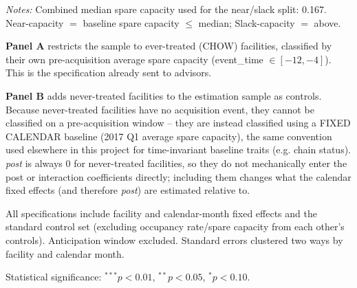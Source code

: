 \documentclass[12pt]{article}
\begin{document}
\begin{table}[H]
\begin{threeparttable}
\begin{tablenotes}[flushleft]
\item \textit{Notes:} Combined median spare capacity used for the near/slack split: 0.167. Near-capacity $=$ baseline spare capacity $\leq$ median; Slack-capacity $=$ above.
\item \textbf{Panel A} restricts the sample to ever-treated (CHOW) facilities, classified by their own pre-acquisition average spare capacity (event\_time $\in [-12,-4]$). This is the specification already sent to advisors.
\item \textbf{Panel B} adds never-treated facilities to the estimation sample as controls. Because never-treated facilities have no acquisition event, they cannot be classified on a pre-acquisition window -- they are instead classified using a FIXED CALENDAR baseline (2017 Q1 average spare capacity), the same convention used elsewhere in this project for time-invariant baseline traits (e.g. chain status). \textit{post} is always 0 for never-treated facilities, so they do not mechanically enter the post or interaction coefficients directly; including them changes what the calendar fixed effects (and therefore \textit{post}) are estimated relative to.
\item All specifications include facility and calendar-month fixed effects and the standard control set (excluding occupancy rate/spare capacity from each other's controls). Anticipation window excluded. Standard errors clustered two ways by facility and calendar month.
\item Statistical significance: $^{***}p<0.01$, $^{**}p<0.05$, $^{*}p<0.10$.
\end{tablenotes}
\end{threeparttable}
\end{table}
\end{document}

